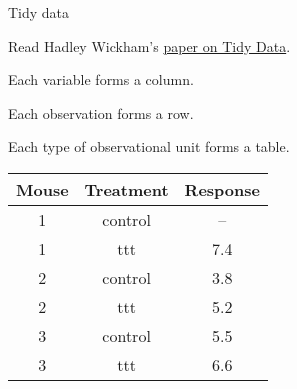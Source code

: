 \documentclass[12pt,t]{beamer}
\begin{document}
\begin{frame}{Tidy data}

\vspace{24pt}

Read Hadley Wickham's
\href{http://vita.had.co.nz/papers/tidy-data.pdf}{paper on Tidy Data}.

\vspace{12pt}

\bi
\item Each variable forms a column.
\item Each observation forms a row.
\item Each type of observational unit forms a table.
\ei

\vspace{12pt}

{\footnotesize
\renewcommand{\arraystretch}{1.05}
\begin{center}
\begin{tabular}{ccc} \hline
Mouse & Treatment & Response \\ \hline
 1    & control  & -- \\
 1    &   ttt    & 7.4 \\
 2    & control  & 3.8 \\
 2    &   ttt    & 5.2 \\
 3    & control  & 5.5 \\
 3    &   ttt    & 6.6 \\ \hline
\end{tabular}
\end{center}
}

\end{frame}
\end{document}
